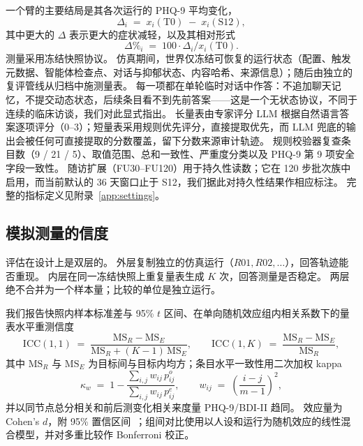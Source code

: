 \documentclass[11pt,a4paper]{article}
\begin{document}
一个臂的主要结局是其各次运行的 PHQ-9 平均变化，
\begin{equation}\label{eq:delta}
\Delta_i \;=\; x_i(\mathrm{T0}) \;-\; x_i(\mathrm{S12}),
\end{equation}
其中更大的 $\Delta$ 表示更大的症状减轻，以及其相对形式
\begin{equation}\label{eq:deltapct}
\Delta\%_i \;=\; 100 \cdot \Delta_i / x_i(\mathrm{T0}).
\end{equation}
测量采用冻结快照协议。
仿真期间，世界仅冻结可恢复的运行状态（配置、触发元数据、智能体检查点、对话与抑郁状态、内容哈希、来源信息）；随后由独立的复评管线从归档中施测量表。
每一项都在单轮临时对话中作答：不追加聊天记忆，不提交动态状态，后续条目看不到先前答案——这是一个无状态协议，不同于连续的临床访谈，我们对此显式指出。
长量表由专家评分 LLM 根据自然语言答案逐项评分（0--3）；短量表采用规则优先评分，直接提取优先，而 LLM 兜底的输出会被任何可直接提取的分数覆盖，留下分数来源审计轨迹。
规则校验器复查条目数（9 / 21 / 5）、取值范围、总和一致性、严重度分类以及 PHQ-9 第 9 项安全字段一致性。
随访扩展（FU30--FU120）用于持久性读数；它在 120 步批次族中启用，而当前默认的 36 天窗口止于 S12，我们据此对持久性结果作相应标注。
完整的指标定义见附录~\ref{app:settings}。

\subsection{模拟测量的信度}\label{sec:reliability}

评估在设计上是双层的。
外层复制独立的仿真运行（$R01, R02, \dots$），回答轨迹能否重现。
内层在同一冻结快照上重复量表生成 $K$ 次，回答测量是否稳定。
两层绝不合并为一个样本量；比较的单位是独立运行。

我们报告快照内样本标准差与 95\% $t$ 区间、在单向随机效应组内相关系数下的量表水平重测信度~\citep{shrout1979}
\begin{equation}\label{eq:icc1}
\mathrm{ICC}(1,1) \;=\; \frac{\mathrm{MS}_R - \mathrm{MS}_E}{\mathrm{MS}_R + (K-1)\,\mathrm{MS}_E},
\qquad
\mathrm{ICC}(1,K) \;=\; \frac{\mathrm{MS}_R - \mathrm{MS}_E}{\mathrm{MS}_R},
\end{equation}
其中 $\mathrm{MS}_R$ 与 $\mathrm{MS}_E$ 为目标间与目标内均方；条目水平一致性用二次加权 kappa~\citep{cohen1968}
\begin{equation}\label{eq:kappa}
\kappa_w \;=\; 1 - \frac{\sum_{i,j} w_{ij}\, p^{o}_{ij}}{\sum_{i,j} w_{ij}\, p^{e}_{ij}},
\qquad
w_{ij} \;=\; \left( \frac{i-j}{m-1} \right)^{2},
\end{equation}
并以同节点总分相关和前后测变化相关来度量 PHQ-9/BDI-II 趋同。
效应量为 Cohen's $d$，附 95\% 置信区间~\citep{cohen1988}；组间对比使用以人设和运行为随机效应的线性混合模型，并对多重比较作 Bonferroni 校正。
\end{document}
